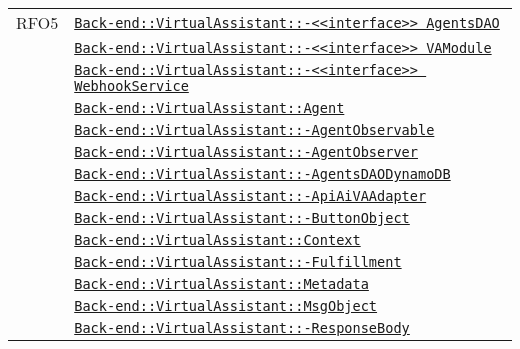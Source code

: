 \begin{longtable}{|>{\centering}m{3cm}|m{10cm}<{\centering}|}
RFO5 & \hyperref[Back-end::VirtualAssistant::<<interface>> AgentsDAO]{\texttt{Back-end::VirtualAssistant::-\linebreak <<interface>> AgentsDAO}}\\
& \hyperref[Back-end::VirtualAssistant::<<interface>> VAModule]{\texttt{Back-end::VirtualAssistant::-\linebreak <<interface>> VAModule}}\\
& \hyperref[Back-end::VirtualAssistant::<<interface>> WebhookService]{\texttt{Back-end::VirtualAssistant::-\linebreak <<interface>> WebhookService}}\\
& \hyperref[Back-end::VirtualAssistant::Agent]{\texttt{Back-end::VirtualAssistant::Agent}}\\
& \hyperref[Back-end::VirtualAssistant::AgentObservable]{\texttt{Back-end::VirtualAssistant::-\linebreak AgentObservable}}\\
& \hyperref[Back-end::VirtualAssistant::AgentObserver]{\texttt{Back-end::VirtualAssistant::-\linebreak AgentObserver}}\\
& \hyperref[Back-end::VirtualAssistant::AgentsDAODynamoDB]{\texttt{Back-end::VirtualAssistant::-\linebreak AgentsDAODynamoDB}}\\
& \hyperref[Back-end::VirtualAssistant::ApiAiVAAdapter]{\texttt{Back-end::VirtualAssistant::-\linebreak ApiAiVAAdapter}}\\
& \hyperref[Back-end::VirtualAssistant::ButtonObject]{\texttt{Back-end::VirtualAssistant::-\linebreak ButtonObject}}\\
& \hyperref[Back-end::VirtualAssistant::Context]{\texttt{Back-end::VirtualAssistant::Context}}\\
& \hyperref[Back-end::VirtualAssistant::Fulfillment]{\texttt{Back-end::VirtualAssistant::-\linebreak Fulfillment}}\\
& \hyperref[Back-end::VirtualAssistant::Metadata]{\texttt{Back-end::VirtualAssistant::Metadata}}\\
& \hyperref[Back-end::VirtualAssistant::MsgObject]{\texttt{Back-end::VirtualAssistant::MsgObject}}\\
& \hyperref[Back-end::VirtualAssistant::ResponseBody]{\texttt{Back-end::VirtualAssistant::-\linebreak ResponseBody}}\\

\end{longtable}

